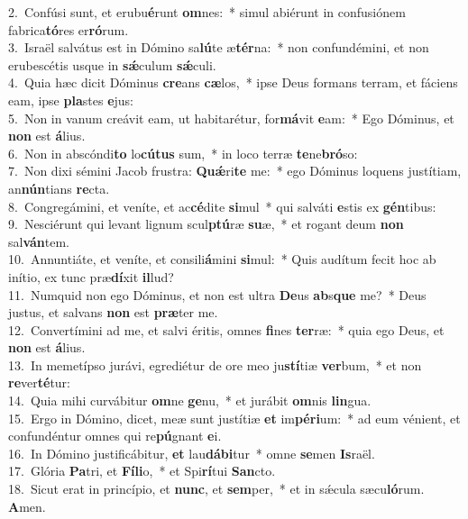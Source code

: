 {2.~}Confúsi sunt, et erubu\textbf{é}runt \textbf{om}nes:~* simul abiérunt in confusiónem fabrica\textbf{tó}res er\textbf{ró}rum.\\
{3.~}Israël salvátus est in Dómino sa\textbf{lú}te æ\textbf{tér}na:~* non confundémini, et non erubescétis usque in \textbf{sǽ}culum \textbf{sǽ}culi.\\
{4.~}Quia hæc dicit Dóminus \textbf{cre}ans \textbf{cæ}los,~* ipse Deus formans terram, et fáciens eam, ipse \textbf{pla}stes \textbf{e}jus:\\
{5.~}Non in vanum creávit eam, ut habitarétur, for\textbf{má}vit \textbf{e}am:~* Ego Dóminus, et \textbf{non} est \textbf{á}lius.\\
{6.~}Non in abscóndi\textbf{to} lo\textbf{cú}\textbf{tus} sum,~* in loco terræ \textbf{te}ne\textbf{bró}so:\\
{7.~}Non dixi sémini Jacob frustra: \textbf{Quǽ}ri\textbf{te} me:~* ego Dóminus loquens justítiam, an\textbf{nún}tians \textbf{re}cta.\\
{8.~}Congregámini, et veníte, et ac\textbf{cé}dite \textbf{si}mul~* qui salváti \textbf{e}stis ex \textbf{gén}tibus:\\
{9.~}Nesciérunt qui levant lignum scul\textbf{ptú}ræ \textbf{su}æ,~* et rogant deum \textbf{non} sal\textbf{ván}tem.\\
{10.~}Annuntiáte, et veníte, et consili\textbf{á}mini \textbf{si}mul:~* Quis audítum fecit hoc ab inítio, ex tunc præ\textbf{dí}xit \textbf{il}lud?\\
{11.~}Numquid non ego Dóminus, et non est ultra \textbf{De}us \textbf{ab}s\textbf{que} me?~* Deus justus, et salvans \textbf{non} est \textbf{præ}ter me.\\
{12.~}Convertímini ad me, et salvi éritis, omnes \textbf{fi}nes \textbf{ter}ræ:~* quia ego Deus, et \textbf{non} est \textbf{á}lius.\\
{13.~}In memetípso jurávi, egrediétur de ore meo ju\textbf{stí}tiæ \textbf{ver}bum,~* et non \textbf{re}ver\textbf{té}tur:\\
{14.~}Quia mihi curvábitur \textbf{om}ne \textbf{ge}nu,~* et jurábit \textbf{om}nis \textbf{lin}gua.\\
{15.~}Ergo in Dómino, dicet, meæ sunt justítiæ \textbf{et} im\textbf{pé}\textbf{ri}um:~* ad eum vénient, et confundéntur omnes qui re\textbf{pú}gnant \textbf{e}i.\\
{16.~}In Dómino justificábitur, \textbf{et} lau\textbf{dá}\textbf{bi}tur~* omne \textbf{se}men \textbf{Is}raël.\\
{17.~}Glória \textbf{Pa}tri, et \textbf{Fí}\textbf{li}o,~* et Spi\textbf{rí}tui \textbf{San}cto.\\
{18.~}Sicut erat in princípio, et \textbf{nunc}, et \textbf{sem}per,~* et in sǽcula sæcu\textbf{ló}rum. \textbf{A}men.\\
